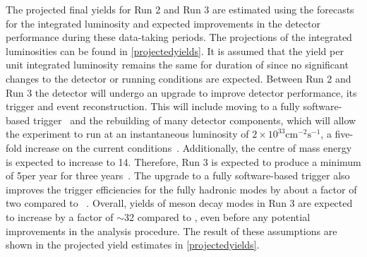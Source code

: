 The projected final yields for Run 2 and Run 3 are estimated using the forecasts for the integrated luminosity and expected improvements in the detector performance during these data-taking periods. The projections of the integrated luminosities can be found in \tab\ref{projectedyields}. It is assumed that the yield per unit integrated luminosity remains the same for duration of \runtwo since no significant changes to the detector or running conditions are expected. Between Run 2 and Run 3 the detector will undergo an upgrade to improve detector performance, its trigger and event reconstruction. This will include moving to a fully software-based trigger~\cite{CERN-LHCC-2014-016} and the rebuilding of many detector components, which will allow the experiment to run at an instantaneous luminosity of $2 \times 10^{33} \text{cm}^{-2}\text{s}^{-1}$, a five-fold increase on the current conditions~\cite{CERN-LHCC-2014-016}. Additionally, the centre of mass energy is expected to increase to 14\tev. Therefore, Run 3 is expected to produce a minimum of 5\invfb per year for three years~\cite{CERN-LHCC-2014-016}. The upgrade to a fully software-based trigger also improves the trigger efficiencies for the fully hadronic modes by about a factor of two compared to \runone~\cite{CERN-LHCC-2014-016}. Overall, yields of \B meson decay modes in Run 3 are expected to increase by a factor of $\sim$32 compared to \runone, even before any potential improvements in the analysis procedure. The result of these assumptions are shown in the projected yield estimates in \tab\ref{projectedyields}.

\begin{table}
\caption{Yields and projected yields for the data-taking periods of the LHC. The entries in bold are projected yields, whereas the other entries refer to data used in this thesis. Projected results are justified in the text, with information taken from Ref.~\cite{CERN-LHCC-2014-016}.}
\label{projectedyields}
\end{table}

